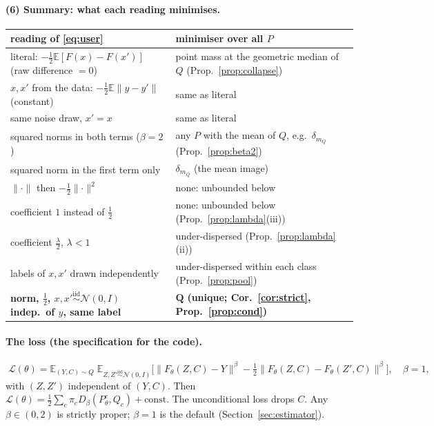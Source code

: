\documentclass[11pt]{article}
\theoremstyle{definition}
\theoremstyle{remark}
\newcommand{\E}{\mathbb{E}}
\newcommand{\N}{\mathcal{N}}
\newcommand{\norm}[1]{\lVert #1\rVert}
\newcommand{\Db}{D_\beta}
\begin{document}
\paragraph{(6) Summary: what each reading minimises.}
\begin{center}
\small
\begin{tabular}{p{6.3cm}p{8.2cm}}
\toprule
reading of \eqref{eq:user} & minimiser over all $P$ \\
\midrule
literal: $-\tfrac12\E[F(x)-F(x')]$ (raw difference $=0$) & point mass at the geometric median of $Q$ (Prop.~\ref{prop:collapse}) \\
$x,x'$ from the data: $-\tfrac12\E\norm{y-y'}$ (constant) & same as literal \\
same noise draw, $x'=x$ & same as literal \\
squared norms in both terms ($\beta=2$) & any $P$ with the mean of $Q$, e.g.\ $\delta_{m_Q}$ (Prop.~\ref{prop:beta2}) \\
squared norm in the first term only & $\delta_{m_Q}$ (the mean image) \\
$\norm{\cdot}$ then $-\tfrac12\norm{\cdot}^2$ & none: unbounded below \\
coefficient $1$ instead of $\tfrac12$ & none: unbounded below (Prop.~\ref{prop:lambda}(iii)) \\
coefficient $\tfrac\lambda2$, $\lambda<1$ & under-dispersed (Prop.~\ref{prop:lambda}(ii)) \\
labels of $x,x'$ drawn independently & under-dispersed within each class (Prop.~\ref{prop:pool}) \\
\textbf{norm, $\tfrac12$, $x,x'\overset{\text{iid}}{\sim}\N(0,I)$ indep.\ of $y$, same label} & $\boldsymbol{Q}$ \textbf{(unique; Cor.~\ref{cor:strict}, Prop.~\ref{prop:cond})}\\
\bottomrule
\end{tabular}
\end{center}

\paragraph{The loss (the specification for the code).}
\begin{equation}\label{eq:final}
\boxed{\;
\mathcal L(\theta)=\E_{(Y,C)\sim Q}\;\E_{Z,Z'\overset{\text{iid}}{\sim}\N(0,I)}\Big[\norm{F_\theta(Z,C)-Y}^{\beta}-\tfrac12\norm{F_\theta(Z,C)-F_\theta(Z',C)}^{\beta}\Big],\quad \beta=1,
\;}
\end{equation}
with $(Z,Z')$ independent of $(Y,C)$. Then $\mathcal L(\theta)=\tfrac12\sum_c\pi_c\Db(P^c_\theta,Q_c)+\mathrm{const}$.
The unconditional loss drops $C$. Any $\beta\in(0,2)$ is strictly proper; $\beta=1$ is the default
(Section~\ref{sec:estimator}).
\end{document}
